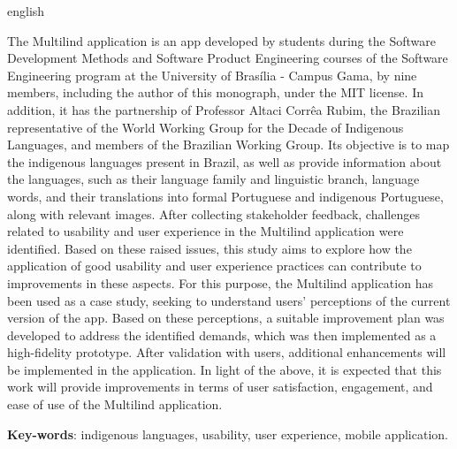 \begin{resumo}[Abstract]
 \begin{otherlanguage*}{english}
   
  The Multilind application is an app developed by students during the Software Development Methods and Software Product Engineering courses of the Software Engineering program at the University of Brasília - Campus Gama, 
  by nine members, including the author of this monograph, under the MIT license. In addition, it has the partnership of Professor Altaci Corrêa Rubim, the Brazilian representative of the World Working Group for the Decade 
  of Indigenous Languages, and members of the Brazilian Working Group. Its objective is to map the indigenous languages present in Brazil, as well as provide information about the languages, such as their language family and 
  linguistic branch, language words, and their translations into formal Portuguese and indigenous Portuguese, along with relevant images. After collecting stakeholder feedback, challenges related to usability and user experience 
  in the Multilind application were identified. Based on these raised issues, this study aims to explore how the application of good usability and user experience practices can contribute to improvements in these aspects. 
  For this purpose, the Multilind application has been used as a case study, seeking to understand users' perceptions of the current version of the app. Based on these perceptions, a suitable improvement plan was developed 
  to address the identified demands, which was then implemented as a high-fidelity prototype. After validation with users, additional enhancements will be implemented in the application. In light of the above, it is expected 
  that this work will provide improvements in terms of user satisfaction, engagement, and ease of use of the Multilind application.


   \vspace{\onelineskip}
 
   \noindent 
   \textbf{Key-words}: indigenous languages, usability, user experience, mobile application.
 \end{otherlanguage*}
\end{resumo}

